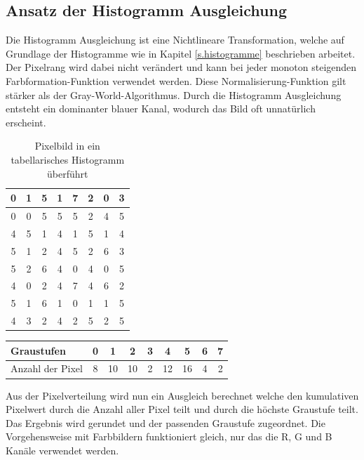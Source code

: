   \subsection{Ansatz der Histogramm Ausgleichung}\label{s.ha}
  Die Histogramm Ausgleichung ist eine Nichtlineare Transformation, welche auf Grundlage der Histogramme wie in Kapitel \ref{s.histogramme} beschrieben arbeitet. Der Pixelrang wird dabei nicht verändert und kann bei jeder monoton steigenden Farbformation-Funktion verwendet werden. Diese Normalisierung-Funktion gilt stärker als der Gray-World-Algorithmus. Durch die Histogramm Ausgleichung entsteht ein dominanter blauer Kanal, wodurch das Bild oft unnatürlich erscheint.
   \begin{table}
  [h]
  \centering
  \caption{Pixelbild in ein tabellarisches Histogramm überführt}
  \begin{tabular}{|c|c|c|c|c|c|c|c|}
  \hline
  0&1&5&1&7&2&0&3\\
  \hline
  0&0&5&5&5&2&4&5\\
  \hline
  4&5&1&4&1&5&1&4\\
  \hline
  5&1&2&4&5&2&6&3\\
  \hline
  5&2&6&4&0&4&0&5\\
  \hline
  4&0&2&4&7&4&6&2\\
  \hline
  5&1&6&1&0&1&1&5\\
  \hline
  4&3&2&4&2&5&2&5\\
  \hline
  \end{tabular}
  \end{table}
  \begin{table}
  [h]
  \centering
  \begin{tabular}{|l|c|c|c|c|c|c|c|c|}
  \hline
  Graustufen & 0 & 1 & 2 & 3 & 4 & 5 & 6 & 7\\
  \hline
  Anzahl der Pixel & 8 & 10 & 10 & 2 & 12 & 16 & 4 & 2\\
  \hline
  \end{tabular}
  \end{table}
Aus der Pixelverteilung wird nun ein Ausgleich berechnet welche den kumulativen Pixelwert durch die Anzahl aller Pixel teilt und durch die höchste Graustufe teilt. Das Ergebnis wird gerundet und der passenden Graustufe zugeordnet. Die Vorgehensweise mit Farbbildern funktioniert gleich, nur das die R, G und B Kanäle verwendet werden.
